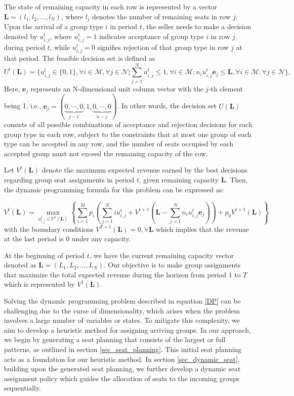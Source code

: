 The state of remaining capacity in each row is represented by a vector $\mathbf{L} = (l_1, l_2, \ldots, l_N)$, where $l_j$ denotes the number of remaining seats in row $j$. Upon the arrival of a group type $i$ in period $t$, the seller needs to make a decision denoted by $u_{i,j}^{t}$, where $u_{i,j}^{t} = 1$ indicates acceptance of group type $i$ in row $j$ during period $t$, while $u_{i,j}^{t} = 0$ signifies rejection of that group type in row $j$ at that period. The feasible decision set is defined as $$U^{t}(\mathbf{L}) = \{u_{i,j}^{t} \in \{0,1\}, \forall i \in \mathcal{M}, \forall j \in \mathcal{N} | \sum_{j=1}^{N} u_{i,j}^{t} \leq 1, \forall i \in \mathcal{M}; n_{i}u_{i,j}^{t}\mathbf{e}_j \leq \mathbf{L}, \forall i \in \mathcal{M}, \forall j \in \mathcal{N}\}.$$ Here, $\mathbf{e}_j$ represents an N-dimensional unit column vector with the $j$-th element being 1, i.e., $\mathbf{e}_j = (\underbrace{0, \cdots, 0}_{j-1}, 1, \underbrace{0, \cdots, 0}_{n-j})$. In other words, the decision set $U(\mathbf{L})$ consists of all possible combinations of acceptance and rejection decisions for each group type in each row, subject to the constraints that at most one group of each type can be accepted in any row, and the number of seats occupied by each accepted group must not exceed the remaining capacity of the row.

Let $V^{t}(\mathbf{L})$ denote the maximum expected revenue earned by the best decisions regarding group seat assignments in period $t$, given remaining capacity $\mathbf{L}$. Then, the dynamic programming formula for this problem can be expressed as:

\begin{equation}\label{DP}
V^{t}(\mathbf{L}) = \max_{u_{i,j}^{t} \in U^{t}(\mathbf{L})}\left\{ \sum_{i=1}^{M} p_i ( \sum_{j=1}^{N} i u_{i,j}^{t} + V^{t+1}(\mathbf{L}- \sum_{j=1}^{N} n_i u_{i,j}^{t}\mathbf{e}_j)) + p_0 V^{t+1}(\mathbf{L})\right\}
\end{equation}
with the boundary conditions $V^{T+1}(\mathbf{L}) = 0, \forall \mathbf{L}$ which implies that the revenue at the last period is 0 under any capacity.

At the beginning of period $t$, we have the current remaining capacity vector denoted as $\mathbf{L} = (L_1, L_2, \ldots, L_N)$. Our objective is to make group assignments that maximize the total expected revenue during the horizon from period 1 to $T$ which is represented by $V^{1}(\mathbf{L})$.

Solving the dynamic programming problem described in equation \eqref{DP} can be challenging due to the curse of dimensionality, which arises when the problem involves a large number of variables or states. To mitigate this complexity, we aim to develop a heuristic method for assigning arriving groups. In our approach, we begin by generating a seat planning that consists of the largest or full patterns, as outlined in section \ref{sec_seat_planning}. This initial seat planning acts as a foundation for our heuristic method. In section \ref{sec_dynamic_seat}, building upon the generated seat planning, we further develop a dynamic seat assignment policy which guides the allocation of seats to the incoming groups sequentially. 
